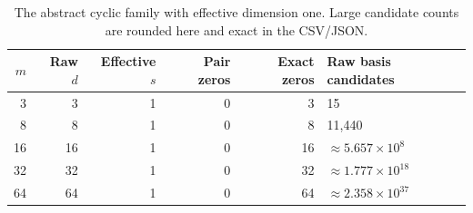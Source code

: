 \begin{table}[htbp]
\centering
\small
\begin{tabular}{@{}rrrrrl@{}}
\toprule
$m$ & Raw $d$ & Effective $s$ & Pair zeros & Exact zeros & Raw basis candidates\\
\midrule
3 & 3 & 1 & 0 & 3 & 15\\
8 & 8 & 1 & 0 & 8 & 11,440\\
16 & 16 & 1 & 0 & 16 & $\approx 5.657\times10^{8}$\\
32 & 32 & 1 & 0 & 32 & $\approx 1.777\times10^{18}$\\
64 & 64 & 1 & 0 & 64 & $\approx 2.358\times10^{37}$\\
\bottomrule
\end{tabular}
\caption{The abstract cyclic family with effective dimension one. Large candidate counts are rounded here and exact in the CSV/JSON.}
\label{tab:abstract-family}
\end{table}
